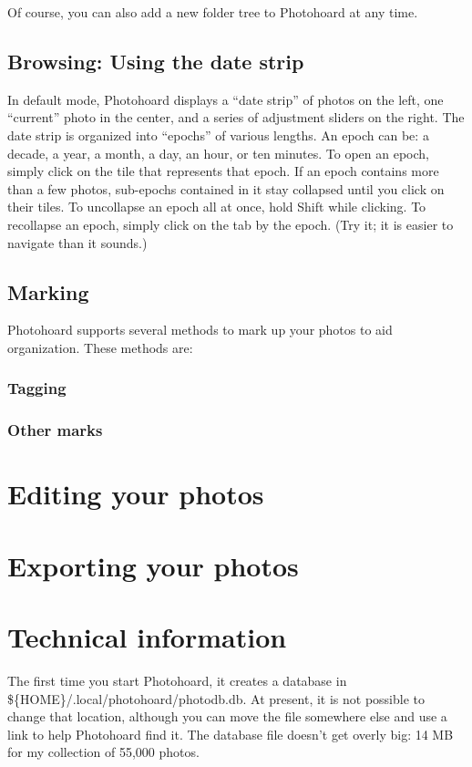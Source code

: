 \documentclass[11pt]{report}
\begin{document}
Of course, you can also add a new folder tree to Photohoard at any
time.

\section{Browsing: Using the date strip}

In default mode, Photohoard displays a ``date strip'' of photos on the left,
one ``current'' photo in the center, and a series of adjustment
sliders on the right. The date strip is organized into ``epochs'' of
various lengths. An epoch can be: a decade, a year, a month, a day, an
hour, or ten minutes. To open an epoch, simply click on the tile  that
represents that epoch. If an epoch contains more than a few photos,
sub-epochs contained in it stay collapsed until you click on their
tiles. To uncollapse an epoch all at once, hold Shift while
clicking. To recollapse an epoch, simply click on the tab by the
epoch. (Try it; it is easier to navigate than it sounds.)

\section{Marking}

Photohoard supports several methods to mark up your photos to aid
organization. These methods are:
\begin{itemize}
\end{itemize}

\subsection{Tagging}

\subsection{Other marks}



\chapter{Editing your photos}

\chapter{Exporting your photos}


\chapter{Technical information}
The first time you start Photohoard, it creates a database in
\$\{HOME\}/.local/photohoard/photodb.db. At present, it is not possible to change
that location, although you can move the file somewhere else and use a
link to help Photohoard find it. The database file doesn't get overly
big: 14 MB for my collection of 55,000 photos.
\end{document}
